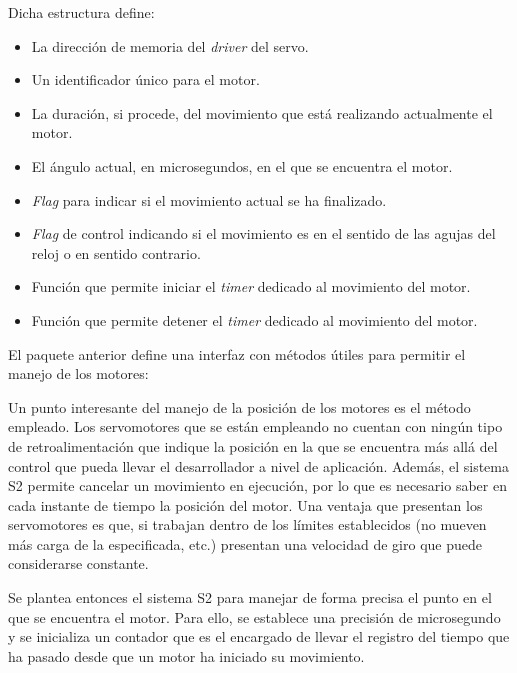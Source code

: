 Dicha estructura define:

\begin{itemize}
    \item La dirección de memoria del \textit{driver} del servo.
    \item Un identificador único para el motor.
    \item La duración, si procede, del movimiento que está realizando actualmente el motor.
    \item El ángulo actual, en microsegundos, en el que se encuentra el motor.
    \item \textit{Flag} para indicar si el movimiento actual se ha finalizado.
    \item \textit{Flag} de control indicando si el movimiento es en el sentido de las agujas del reloj o en sentido contrario.
    \item Función que permite iniciar el \textit{timer} dedicado al movimiento del motor.
    \item Función que permite detener el \textit{timer} dedicado al movimiento del motor.
\end{itemize}

El paquete anterior define una interfaz con métodos útiles para permitir el manejo
de los motores:




Un punto interesante del manejo de la posición de los motores es el método empleado.
Los servomotores que se están empleando no cuentan con ningún tipo de retroalimentación
que indique la posición en la que se encuentra más allá del control que pueda llevar
el desarrollador a nivel de aplicación. Además, el sistema \ac{S2} permite cancelar un
movimiento en ejecución, por lo que es necesario saber en cada instante de tiempo la
posición del motor. Una ventaja que presentan los servomotores es que, si trabajan
dentro de los límites establecidos (no mueven más carga de la especificada, etc.)
presentan una velocidad de giro que puede considerarse constante.

Se plantea entonces el sistema \ac{S2} para manejar de forma precisa el punto
en el que se encuentra el motor. Para ello, se establece una precisión de microsegundo
y se inicializa un contador que es el encargado de llevar el registro del tiempo
que ha pasado desde que un motor ha iniciado su movimiento.


